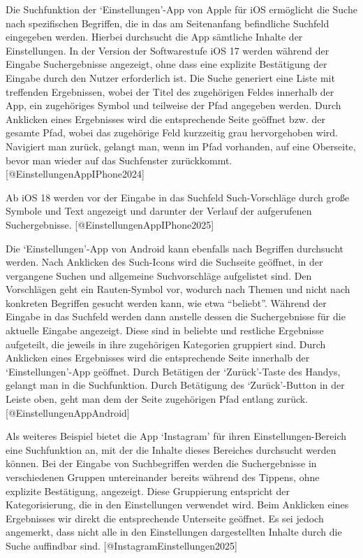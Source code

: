 \documentclass[
  12pt,
  a4paperpaper,
]{report}
\begin{document}
Die Suchfunktion der `Einstellungen'-App von Apple für iOS ermöglicht
die Suche nach spezifischen Begriffen, die in das am Seitenanfang
befindliche Suchfeld eingegeben werden. Hierbei durchsucht die App
sämtliche Inhalte der Einstellungen. In der Version der Softwarestufe
iOS 17 werden während der Eingabe Suchergebnisse angezeigt, ohne dass
eine explizite Bestätigung der Eingabe durch den Nutzer erforderlich
ist. Die Suche generiert eine Liste mit treffenden Ergebnissen, wobei
der Titel des zugehörigen Feldes innerhalb der App, ein zugehöriges
Symbol und teilweise der Pfad angegeben werden. Durch Anklicken eines
Ergebnisses wird die entsprechende Seite geöffnet bzw. der gesamte Pfad,
wobei das zugehörige Feld kurzzeitig grau hervorgehoben wird. Navigiert
man zurück, gelangt man, wenn im Pfad vorhanden, auf eine Oberseite,
bevor man wieder auf das Suchfenster zurückkommt.
{[}@EinstellungenAppIPhone2024{]}

Ab iOS 18 werden vor der Eingabe in das Suchfeld Such-Vorschläge durch
große Symbole und Text angezeigt und darunter der Verlauf der
aufgerufenen Suchergebnisse. {[}@EinstellungenAppIPhone2025{]}

Die `Einstellungen'-App von Android kann ebenfalls nach Begriffen
durchsucht werden. Nach Anklicken des Such-Icons wird die Suchseite
geöffnet, in der vergangene Suchen und allgemeine Suchvorschläge
aufgelistet sind. Den Vorschlägen geht ein Rauten-Symbol vor, wodurch
nach Themen und nicht nach konkreten Begriffen gesucht werden kann, wie
etwa ``beliebt''. Während der Eingabe in das Suchfeld werden dann
anstelle dessen die Suchergebnisse für die aktuelle Eingabe angezeigt.
Diese sind in beliebte und restliche Ergebnisse aufgeteilt, die jeweils
in ihre zugehörigen Kategorien gruppiert sind. Durch Anklicken eines
Ergebnisses wird die entsprechende Seite innerhalb der
`Einstellungen'-App geöffnet. Durch Betätigen der `Zurück'-Taste des
Handys, gelangt man in die Suchfunktion. Durch Betätigung des
`Zurück'-Button in der Leiste oben, geht man dem der Seite zugehörigen
Pfad entlang zurück. {[}@EinstellungenAppAndroid{]}

Als weiteres Beispiel bietet die App `Instagram' für ihren
Einstellungen-Bereich eine Suchfunktion an, mit der die Inhalte dieses
Bereiches durchsucht werden können. Bei der Eingabe von Suchbegriffen
werden die Suchergebnisse in verschiedenen Gruppen untereinander bereits
während des Tippens, ohne explizite Bestätigung, angezeigt. Diese
Gruppierung entspricht der Kategorisierung, die in den Einstellungen
verwendet wird. Beim Anklicken eines Ergebnisses wir direkt die
entsprechende Unterseite geöffnet. Es sei jedoch angemerkt, dass nicht
alle in den Einstellungen dargestellten Inhalte durch die Suche
auffindbar sind. {[}@InstagramEinstellungen2025{]}
\end{document}
